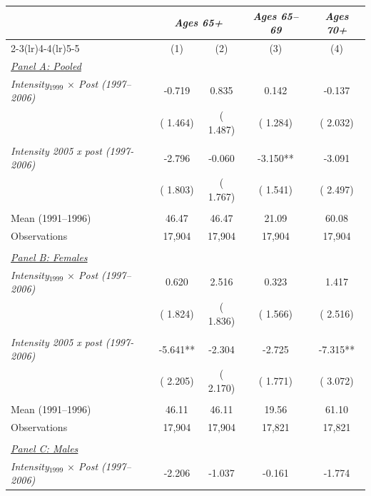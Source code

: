 \begin{tabular}{lcccc} \hline \hline
& \multicolumn{2}{c}{\textit{Ages 65+}} & \multicolumn{1}{c}{\textit{Ages 65--69}} & \multicolumn{1}{c}{\textit{Ages 70+}} \\ \cmidrule(lr){2-3}\cmidrule(lr){4-4}\cmidrule(lr){5-5}
& \multicolumn{1}{c}{(1)} & \multicolumn{1}{c}{(2)} & \multicolumn{1}{c}{(3)} & \multicolumn{1}{c}{(4)} \\ \toprule
\underline{\textit{Panel A: Pooled}}  \\ 
\textit{Intensity$_{1999}$ $\times$ Post (1997--2006)} &       -0.719 &        0.835 &        0.142 &       -0.137 \\ 
 & (       1.464) & (       1.487) & (       1.284) & (       2.032) \\ 
  & & & & \\ 
\textit{Intensity 2005 x post (1997-2006)} &       -2.796 &       -0.060 &       -3.150** &       -3.091 \\ 
 & (       1.803) & (       1.767) & (       1.541) & (       2.497) \\ 
  & & & & \\ 
Mean (1991--1996) &        46.47 &        46.47 &        21.09 &        60.08 \\ 
Observations &       17,904 &       17,904 &       17,904 &       17,904 \\ 
  & & & & \\ 
\underline{\textit{Panel B: Females}}  \\ 
\textit{Intensity$_{1999}$ $\times$ Post (1997--2006)} &        0.620 &        2.516 &        0.323 &        1.417 \\ 
 & (       1.824) & (       1.836) & (       1.566) & (       2.516) \\ 
  & & & & \\ 
\textit{Intensity 2005 x post (1997-2006)} &       -5.641** &       -2.304 &       -2.725 &       -7.315** \\ 
 & (       2.205) & (       2.170) & (       1.771) & (       3.072) \\ 
  & & & & \\ 
Mean (1991--1996) &        46.11 &        46.11 &        19.56 &        61.10 \\ 
Observations &       17,904 &       17,904 &       17,821 &       17,821 \\ 
  & & & & \\ 
\underline{\textit{Panel C: Males}}  \\ 
\textit{Intensity$_{1999}$ $\times$ Post (1997--2006)} &       -2.206 &       -1.037 &       -0.161 &       -1.774 \\ 

\end{tabular}
